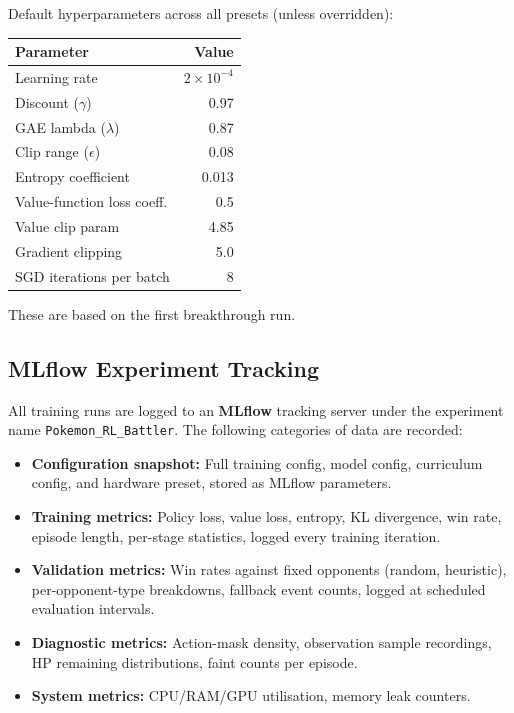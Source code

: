 Default hyperparameters across all presets (unless overridden):

\begin{center}
\small
\begin{tabularx}{0.7\textwidth}{l r}
  \toprule
  \textbf{Parameter} & \textbf{Value} \\
  \midrule
  Learning rate              & $2 \times 10^{-4}$ \\
  Discount ($\gamma$)        & 0.97 \\
  GAE lambda ($\lambda$)     & 0.87 \\
  Clip range ($\epsilon$)    & 0.08 \\
  Entropy coefficient        & 0.013 \\
  Value-function loss coeff. & 0.5 \\
  Value clip param           & 4.85 \\
  Gradient clipping          & 5.0 \\
  SGD iterations per batch   & 8 \\
  \bottomrule
\end{tabularx}
\end{center}

These are based on the first breakthrough run.

\subsection{MLflow Experiment Tracking}

All training runs are logged to an \textbf{MLflow} tracking server under the
experiment name \texttt{Pokemon\_RL\_Battler}.  The following categories of
data are recorded:

\begin{itemize}
  \item \textbf{Configuration snapshot:} Full training config, model config,
        curriculum config, and hardware preset, stored as MLflow parameters.
  \item \textbf{Training metrics:} Policy loss, value loss, entropy,
        KL divergence, win rate, episode length, per-stage statistics, logged
        every training iteration.
  \item \textbf{Validation metrics:} Win rates against fixed opponents
        (random, heuristic), per-opponent-type breakdowns, fallback event
        counts, logged at scheduled evaluation intervals.
  \item \textbf{Diagnostic metrics:} Action-mask density, observation sample
        recordings, HP remaining distributions, faint counts per episode.
  \item \textbf{System metrics:} CPU/RAM/GPU utilisation, memory leak counters.
\end{itemize}

